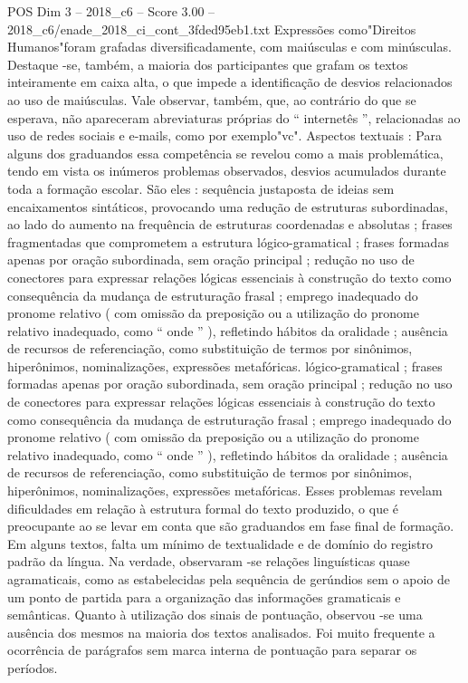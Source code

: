 \begin{textsample}{POS Dim 3 – 2018\_c6 – Score 3.00 – 2018\_c6/enade\_2018\_ci\_cont\_3fded95eb1.txt}
Expressões como"Direitos Humanos"foram grafadas diversificadamente, com maiúsculas e com minúsculas.
Destaque -se, também, a maioria dos participantes que grafam os textos inteiramente em caixa alta, o que impede a identificação de desvios relacionados ao uso de maiúsculas.
Vale observar, também, que, ao contrário do que se esperava, não apareceram abreviaturas próprias do “ internetês ”, relacionadas ao uso de redes sociais e e-mails, como por exemplo"vc".
Aspectos textuais : Para alguns dos graduandos essa competência se revelou como a mais problemática, tendo em vista os inúmeros problemas observados, desvios acumulados durante toda a formação escolar.
São eles : sequência justaposta de ideias sem encaixamentos sintáticos, provocando uma redução de estruturas subordinadas, ao lado do aumento na frequência de estruturas coordenadas e absolutas ; frases fragmentadas que comprometem a estrutura lógico-gramatical ; frases formadas apenas por oração subordinada, sem oração principal ; redução no uso de conectores para expressar relações lógicas essenciais à construção do texto como consequência da mudança de estruturação frasal ; emprego inadequado do pronome relativo ( com omissão da preposição ou a utilização do pronome relativo inadequado, como “ onde ” ), refletindo hábitos da oralidade ; ausência de recursos de referenciação, como substituição de termos por sinônimos, hiperônimos, nominalizações, expressões metafóricas. lógico-gramatical ; frases formadas apenas por oração subordinada, sem oração principal ; redução no uso de conectores para expressar relações lógicas essenciais à construção do texto como consequência da mudança de estruturação frasal ; emprego inadequado do pronome relativo ( com omissão da preposição ou a utilização do pronome relativo inadequado, como “ onde ” ), refletindo hábitos da oralidade ; ausência de recursos de referenciação, como substituição de termos por sinônimos, hiperônimos, nominalizações, expressões metafóricas.
Esses problemas revelam dificuldades em relação à estrutura formal do texto produzido, o que é preocupante ao se levar em conta que são graduandos em fase final de formação.
Em alguns textos, falta um mínimo de textualidade e de domínio do registro padrão da língua.
Na verdade, observaram -se relações linguísticas quase agramaticais, como as estabelecidas pela sequência de gerúndios sem o apoio de um ponto de partida para a organização das informações gramaticais e semânticas.
Quanto à utilização dos sinais de pontuação, observou -se uma ausência dos mesmos na maioria dos textos analisados.
Foi muito frequente a ocorrência de parágrafos sem marca interna de pontuação para separar os períodos.

\end{textsample}
